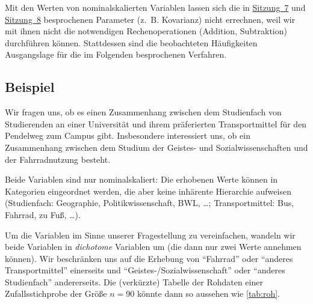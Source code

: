 \documentclass[
  11pt,
  ngerman,
  a4paper,
]{report}
\begin{document}
Mit den Werten von nominalskalierten Variablen lassen sich die in \protect\hyperlink{korrelation}{Sitzung~7} und \protect\hyperlink{lineare-regression}{Sitzung~8} besprochenen Parameter (z.~B. Kovarianz) nicht errechnen, weil wir mit ihnen nicht die notwendigen Rechenoperationen (Addition, Subtraktion) durchführen können. Stattdessen sind die beobachteten Häufigkeiten Ausgangslage für die im Folgenden besprochenen Verfahren.

\hypertarget{beispiel-29}{%
\subsection{Beispiel}\label{beispiel-29}}

Wir fragen uns, ob es einen Zusammenhang zwischen dem Studienfach von Studierenden an einer Universität und ihrem präferierten Transportmittel für den Pendelweg zum Campus gibt. Insbesondere interessiert uns, ob ein Zusammenhang zwischen dem Studium der Geistes- und Sozialwissenschaften und der Fahrradnutzung besteht.

Beide Variablen sind nur nominalskaliert: Die erhobenen Werte können in Kategorien eingeordnet werden, die aber keine inhärente Hierarchie aufweisen (Studienfach: Geographie, Politikwissenschaft, BWL, \ldots; Transportmittel: Bus, Fahrrad, zu Fuß, \ldots).

Um die Variablen im Sinne unserer Fragestellung zu vereinfachen, wandeln wir beide Variablen in \emph{dichotome} Variablen um (die dann nur zwei Werte annehmen können). Wir beschränken uns auf die Erhebung von \enquote{Fahrrad} oder \enquote{anderes Transportmittel} einerseits und \enquote{Geistes-/Sozialwissenschaft} oder \enquote{anderes Studienfach} andererseits. Die (verkürzte) Tabelle der Rohdaten einer Zufallsstichprobe der Größe \(n=90\) könnte dann so aussehen wie \ref{tab:roh}.
\end{document}
